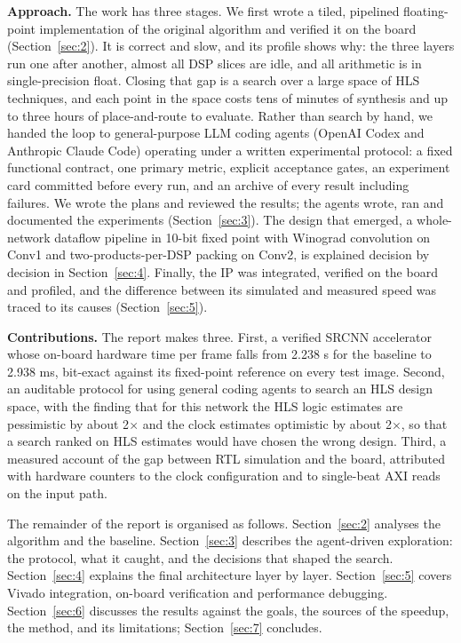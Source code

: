 \textbf{Approach.} The work has three stages. We first wrote a tiled, pipelined floating-point implementation of the original algorithm and verified it on the board (Section~\ref{sec:2}). It is correct and slow, and its profile shows why: the three layers run one after another, almost all DSP slices are idle, and all arithmetic is in single-precision float. Closing that gap is a search over a large space of HLS techniques, and each point in the space costs tens of minutes of synthesis and up to three hours of place-and-route to evaluate. Rather than search by hand, we handed the loop to general-purpose LLM coding agents (OpenAI Codex and Anthropic Claude Code) operating under a written experimental protocol: a fixed functional contract, one primary metric, explicit acceptance gates, an experiment card committed before every run, and an archive of every result including failures. We wrote the plans and reviewed the results; the agents wrote, ran and documented the experiments (Section~\ref{sec:3}). The design that emerged, a whole-network dataflow pipeline in 10-bit fixed point with Winograd convolution \cite{ref15,ref16} on Conv1 and two-products-per-DSP packing on Conv2, is explained decision by decision in Section~\ref{sec:4}. Finally, the IP was integrated, verified on the board and profiled, and the difference between its simulated and measured speed was traced to its causes (Section~\ref{sec:5}).

\textbf{Contributions.} The report makes three. First, a verified SRCNN accelerator whose on-board hardware time per frame falls from 2.238 s for the baseline to 2.938 ms, bit-exact against its fixed-point reference on every test image. Second, an auditable protocol for using general coding agents to search an HLS design space, with the finding that for this network the HLS logic estimates are pessimistic by about 2$\times$ and the clock estimates optimistic by about 2$\times$, so that a search ranked on HLS estimates would have chosen the wrong design. Third, a measured account of the gap between RTL simulation and the board, attributed with hardware counters to the clock configuration and to single-beat AXI reads on the input path.

The remainder of the report is organised as follows. Section~\ref{sec:2} analyses the algorithm and the baseline. Section~\ref{sec:3} describes the agent-driven exploration: the protocol, what it caught, and the decisions that shaped the search. Section~\ref{sec:4} explains the final architecture layer by layer. Section~\ref{sec:5} covers Vivado integration, on-board verification and performance debugging. Section~\ref{sec:6} discusses the results against the goals, the sources of the speedup, the method, and its limitations; Section~\ref{sec:7} concludes.
